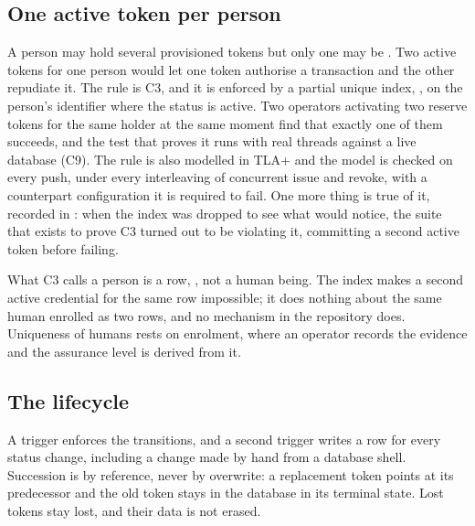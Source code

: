\subsection{One active token per person}

A person may hold several provisioned tokens but only one may be . Two active tokens for
one person would let one token authorise a transaction and the other repudiate it. The rule is C3,
and it is enforced by a partial unique index, , on the person's
identifier where the status is active. Two operators activating two reserve tokens for the same
holder at the same moment find that exactly one of them succeeds, and the test that proves it runs
with real threads against a live database (C9). The rule is also modelled in TLA+ and the model is
checked on every push, under every interleaving of concurrent issue and revoke, with a counterpart
configuration it is required to fail. One more thing is true of it, recorded in \evidencerecord: when the index was dropped to see what would notice, the suite that exists to prove
C3 turned out to be violating it, committing a second active token before failing. \sImpl

What C3 calls a person is a row, , not a human being. The index makes
a second active credential for the same row impossible; it does nothing about the same human
enrolled as two rows, and no mechanism in the repository does. Uniqueness of humans rests on
enrolment, where an operator records the evidence and the assurance level is derived from it.

\subsection{The lifecycle}


A trigger enforces the transitions, and a second trigger writes a  row for every status
change, including a change made by hand from a database shell. Succession is by reference, never by
overwrite: a replacement token points at its predecessor and the old token stays in the database in
its terminal state. Lost tokens stay lost, and their data is not erased. \sImpl

